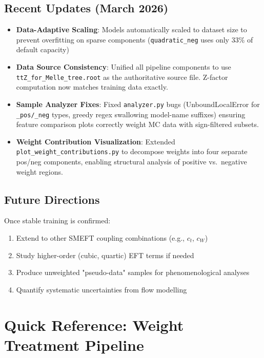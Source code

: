 \documentclass[11pt,a4paper]{article}
\begin{document}
\subsection{Recent Updates (March 2026)}

\begin{itemize}
  \item \textbf{Data-Adaptive Scaling}: Models automatically scaled to dataset size to prevent overfitting on sparse components 
        (\texttt{quadratic\_neg} uses only 33\% of default capacity)
  \item \textbf{Data Source Consistency}: Unified all pipeline components to use \texttt{ttZ\_for\_Melle\_tree.root} as the 
        authoritative source file. Z-factor computation now matches training data exactly.
  \item \textbf{Sample Analyzer Fixes}: Fixed \texttt{analyzer.py} bugs (UnboundLocalError for \texttt{\_pos/\_neg} types, 
        greedy regex swallowing model-name suffixes) ensuring feature comparison plots correctly weight MC data with 
        sign-filtered subsets.
  \item \textbf{Weight Contribution Visualization}: Extended \texttt{plot\_weight\_contributions.py} to decompose weights 
        into four separate pos/neg components, enabling structural analysis of positive vs.\ negative weight regions.
\end{itemize}

\subsection{Future Directions}

Once stable training is confirmed:
\begin{enumerate}
  \item Extend to other SMEFT coupling combinations (e.g., $c_t$, $c_W$)
  \item Study higher-order (cubic, quartic) EFT terms if needed
  \item Produce unweighted "pseudo-data" samples for phenomenological analyses
  \item Quantify systematic uncertainties from flow modelling
\end{enumerate}

\appendix

\section{Quick Reference: Weight Treatment Pipeline}
\end{document}
